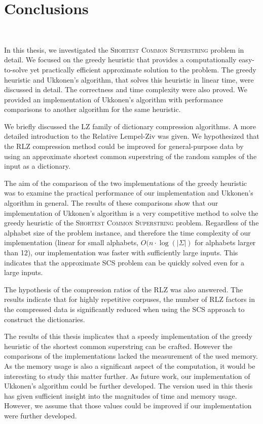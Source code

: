 \documentclass[english,twoside,censored,csm,algorithms-track-2020]{HYthesisML}
\theoremstyle{plain}
\theoremstyle{definition}
\numberwithin{testexample}{chapter}
\begin{document}
\chapter{Conclusions}~\label{chp-conc}

In this thesis, we investigated the \textsc{Shortest Common Superstring} problem
in detail. We focused on the greedy heuristic that provides a computationally
easy-to-solve yet practically efficient approximate solution to the problem.
The greedy heuristic and Ukkonen's algorithm, that solves this heuristic in linear time,
were discussed in detail. The correctness and time complexity were also proved.
We provided an implementation of Ukkonen's algorithm with performance
comparisons to another algorithm for the same heuristic.

We briefly discussed the LZ family of dictionary compression algorithms.
A more detailed introduction to the Relative Lempel-Ziv was given.
We hypothesized that the RLZ compression method could be improved for
general-purpose data by using an approximate shortest common
superstring of the random samples of the input as a dictionary. 

The aim of the comparison of the two implementations of the
greedy heuristic was to examine the practical performance
of our implementation and Ukkonen's algorithm in general.
The results of these comparisons show that our implementation
of Ukkonen's algorithm is a very competitive method to solve
the greedy heuristic of the \textsc{Shortest Common Superstring}
problem. Regardless of the alphabet size of the problem instance,
and therefore the time complexity of our implementation
(linear for small alphabets, $O(n\cdot\log(|\Sigma|)$ for
alphabets larger than 12), our implementation was faster with
sufficiently large inputs. This indicates that the approximate
SCS problem can be quickly solved even for a large inputs.

The hypothesis of the compression ratios of the RLZ was also
answered. The results indicate that for highly repetitive
corpuses, the number of RLZ factors in the compressed data
is significantly reduced when using the SCS approach to
construct the dictionaries.

The results of this thesis implicates that a speedy implementation of the greedy heuristic of
the shortest common superstring can be crafted.
However the comparisons of the implementations lacked the
measurement of the used memory. As the memory usage is also
a significant aspect of the computation, it would be
interesting to study this matter further. As future
work, our implementation of Ukkonen's algorithm could
be further developed. The version used in this thesis
has given sufficient insight into the magnitudes of
time and memory usage. However, we assume that those
values could be improved if our implementation were
further developed.
\end{document}
